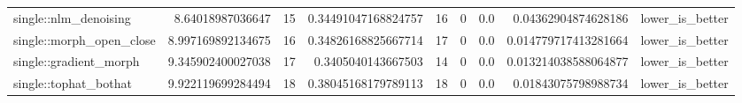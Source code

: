 \begin{tabular}{lrrrrrrrr}
single::nlm\_denoising & 8.64018987036647 & 15 & 0.34491047168824757 & 16 & 0 & 0.0 & 0.04362904874628186 & lower\_is\_better \\
single::morph\_open\_close & 8.997169892134675 & 16 & 0.34826168825667714 & 17 & 0 & 0.0 & 0.014779717413281664 & lower\_is\_better \\
single::gradient\_morph & 9.345902400027038 & 17 & 0.3405040143667503 & 14 & 0 & 0.0 & 0.013214038588064877 & lower\_is\_better \\
single::tophat\_bothat & 9.922119699284494 & 18 & 0.38045168179789113 & 18 & 0 & 0.0 & 0.01843075798988734 & lower\_is\_better \\
\hline
\end{tabular}

